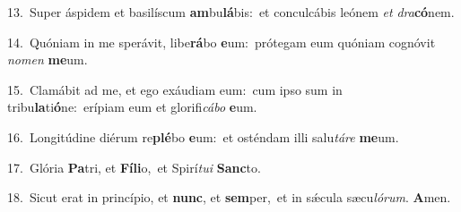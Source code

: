 {\numbfont\textcolor{\numbcolor}{13.}}~Super áspidem et basilíscum \textbf{am}\-bu\-\textbf{lá}\-bis:~\star et conculcábis leónem \textit{et} \textit{dra}\-\textbf{có}nem.\par
{\numbfont\textcolor{\numbcolor}{14.}}~Quóniam in me sperávit, libe\-\textbf{rá}\-bo \textbf{e}\-um:~\star prótegam eum quóniam cognóvit \textit{no}\-\textit{men} \textbf{me}\-um.\par
{\numbfont\textcolor{\numbcolor}{15.}}~Clamábit ad me, et ego exáudiam eum:~\dagger cum ipso sum in tribu\-\textbf{la}\-ti\-\textbf{ó}\-ne:~\star erípiam eum et glorifi\-\textit{cá}\-\textit{bo} \textbf{e}\-um.\par
{\numbfont\textcolor{\numbcolor}{16.}}~Longitúdine diérum re\-\textbf{plé}\-bo \textbf{e}\-um:~\star et osténdam illi salu\-\textit{tá}\-\textit{re} \textbf{me}\-um.\par
{\numbfont\textcolor{\numbcolor}{17.}}~Glória \textbf{Pa}\-tri, et \textbf{Fí}\-\textbf{li}o,~\star et Spirí\-\textit{tu}\-\textit{i} \textbf{Sanc}\-to.\par
{\numbfont\textcolor{\numbcolor}{18.}}~Sicut erat in princípio, et \textbf{nunc}\-, et \textbf{sem}\-per,~\star et in sǽcula sæcu\-\textit{ló}\-\textit{rum}. \textbf{A}\-men.\par
